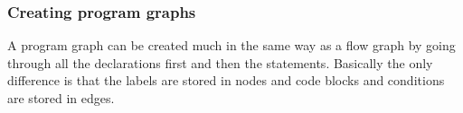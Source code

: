 \subsubsection{Creating program graphs}
A program graph can be created much in the same way as a flow graph by going through all the declarations first and then the statements. Basically the only difference is that the labels are stored in nodes and code blocks and conditions are stored in edges.
% 
% 
% 
% 
% 
% 
% 
